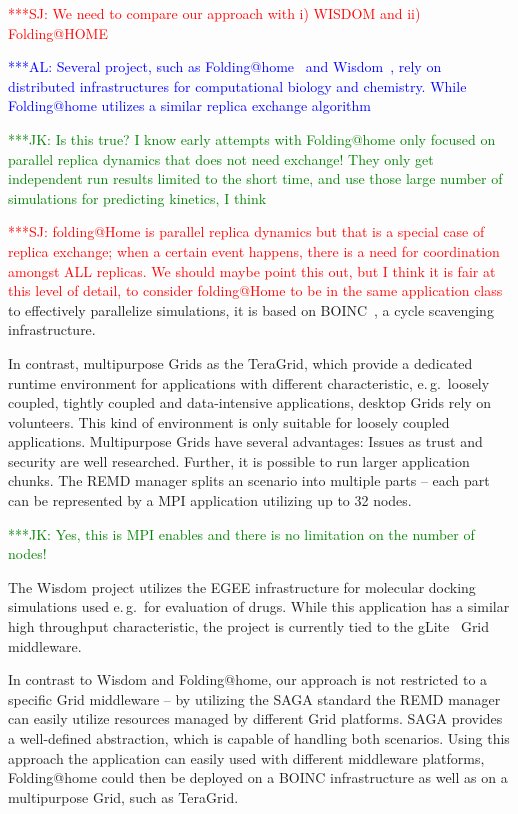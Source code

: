 \documentclass[times, 10pt,twocolumn]{article}
\newcommand{\kimnote}[1]{ {\textcolor{green} { ***JK: #1 }}}
\newcommand{\alnote}[1]{ {\textcolor{blue} { ***AL: #1 }}}
\newcommand{\jhanote}[1]{ {\textcolor{red} { ***SJ: #1 }}}
\begin{document}
\jhanote{We need to compare our approach with i) WISDOM and ii)
  Folding@HOME}             

\alnote{Several project, such as Folding@home~\cite{folding} and
  Wisdom~\cite{wisdom}, rely on distributed infrastructures for
  computational biology and chemistry. While Folding@home utilizes a
  similar replica exchange algorithm~\cite{PhysRevLett.86.4983}}

  \kimnote{Is this true? I know early attempts with Folding@home only
    focused on parallel replica dynamics that does not need exchange!
    They only get independent run results limited to the short time,
    and use those large number of simulations for predicting kinetics,
    I think}


  \jhanote{folding@Home is parallel replica dynamics but that is a
    special case of replica exchange; when a certain event happens,
    there is a need for coordination amongst ALL replicas. We should
    maybe point this out, but I think it is fair at this level of
    detail, to consider folding@Home to be in the same application
    class} to effectively parallelize simulations, it is based on
  BOINC~\cite{1033223}, a cycle scavenging infrastructure.

  In contrast, multipurpose Grids as the TeraGrid, which provide a
  dedicated runtime environment for applications with different
  characteristic, e.\,g.\ loosely coupled, tightly coupled and
  data-intensive applications, desktop Grids rely on volunteers. This
  kind of environment is only suitable for loosely coupled
  applications. Multipurpose Grids have several advantages: Issues as
  trust and security are well researched. Further, it is possible to
  run larger application chunks. The REMD manager splits an scenario
  into multiple parts -- each part can be represented by a MPI
  application utilizing up to 32 nodes.

  \kimnote{Yes, this is MPI enables and there is no limitation on the
    number of nodes!}

  The Wisdom project utilizes the EGEE infrastructure for molecular
  docking simulations used e.\,g.\ for evaluation of drugs. While this
  application has a similar high throughput characteristic, the
  project is currently tied to the gLite~\cite{glite2008} Grid
  middleware.

  In contrast to Wisdom and Folding@home, our approach is not
  restricted to a specific Grid middleware -- by utilizing the SAGA
  standard the REMD manager can easily utilize resources managed by
  different Grid platforms. SAGA provides a well-defined abstraction,
  which is capable of handling both scenarios. Using this approach the
  application can easily used with different middleware platforms,
  Folding@home could then be deployed on a BOINC infrastructure as
  well as on a multipurpose Grid, such as TeraGrid.
\end{document}

